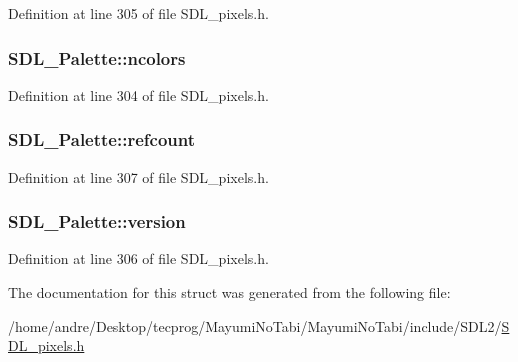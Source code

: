 Definition at line 305 of file S\-D\-L\-\_\-pixels.\-h.

\hypertarget{struct_s_d_l___palette_a81a0cc3197480e994c6b06f1f0567091}{
\subsubsection[{ncolors}]{ S\-D\-L\-\_\-\-Palette\-::ncolors}}\label{struct_s_d_l___palette_a81a0cc3197480e994c6b06f1f0567091}


Definition at line 304 of file S\-D\-L\-\_\-pixels.\-h.

\hypertarget{struct_s_d_l___palette_a35c667737f883f973bb0a8dea143b08d}{
\subsubsection[{refcount}]{ S\-D\-L\-\_\-\-Palette\-::refcount}}\label{struct_s_d_l___palette_a35c667737f883f973bb0a8dea143b08d}


Definition at line 307 of file S\-D\-L\-\_\-pixels.\-h.

\hypertarget{struct_s_d_l___palette_a5b8d45519f6850a32f13f1602ce37a8e}{
\subsubsection[{version}]{ S\-D\-L\-\_\-\-Palette\-::version}}\label{struct_s_d_l___palette_a5b8d45519f6850a32f13f1602ce37a8e}


Definition at line 306 of file S\-D\-L\-\_\-pixels.\-h.



The documentation for this struct was generated from the following file\-:\begin{DoxyCompactItemize}
\item 
/home/andre/\-Desktop/tecprog/\-Mayumi\-No\-Tabi/\-Mayumi\-No\-Tabi/include/\-S\-D\-L2/\hyperlink{_s_d_l__pixels_8h}{S\-D\-L\-\_\-pixels.\-h}\end{DoxyCompactItemize}
